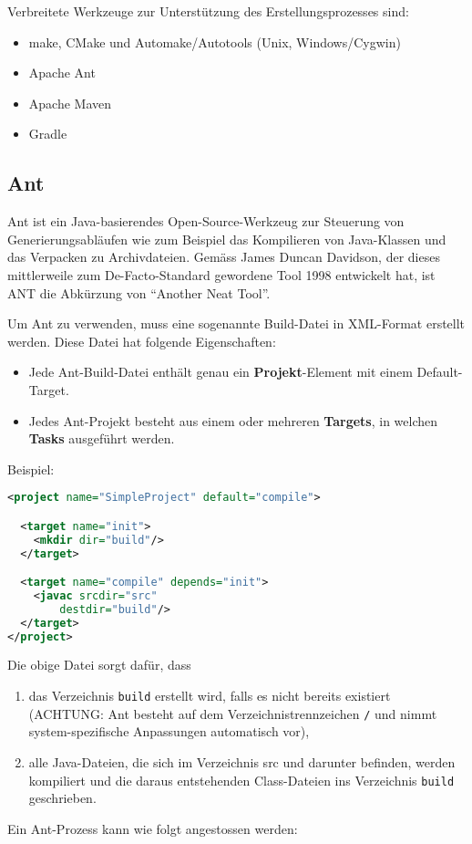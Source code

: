 Verbreitete Werkzeuge zur Unterstützung des Erstellungsprozesses sind:
\begin{itemize}
\item make, CMake und Automake/Autotools (Unix, Windows/Cygwin)
\item Apache Ant
\item Apache Maven
\item Gradle
\end{itemize}
%
\subsection{Ant}
Ant ist ein Java-basierendes Open-Source-Werkzeug zur Steuerung von
  Generierungsabläufen wie
  zum Beispiel das Kompilieren von Java-Klassen und das Verpacken
zu Archivdateien. Gemäss James Duncan
  Davidson, der dieses mittlerweile zum De-Facto-Standard gewordene Tool 1998
  entwickelt hat, ist ANT die Abkürzung von ``Another Neat Tool''.

Um Ant zu verwenden, muss eine sogenannte Build-Datei in XML-Format erstellt
werden. Diese Datei hat folgende Eigenschaften:
\begin{itemize}
\item Jede Ant-Build-Datei
   enthält genau ein {\bfseries Projekt}-Element mit einem Default-Target.
\item Jedes Ant-Projekt besteht aus einem oder mehreren {\bfseries Targets}, in
  welchen {\bfseries Tasks} ausgeführt werden.
\end{itemize}
\newslide
Beispiel:
\begin{lstlisting}[language=xml,morekeywords={project,target,javac,mkdir}]
<project name="SimpleProject" default="compile">

  <target name="init">
    <mkdir dir="build"/>
  </target>

  <target name="compile" depends="init">
    <javac srcdir="src"
        destdir="build"/>
  </target>
</project>
\end{lstlisting}
\ifslides
\else
Die obige Datei sorgt dafür, dass
\begin{enumerate}
\item das Verzeichnis \verb+build+ erstellt wird, falls es nicht
  bereits existiert (ACHTUNG: Ant besteht auf dem Verzeichnistrennzeichen
  \verb+/+ und nimmt system-spezifische Anpassungen automatisch vor),
\item alle Java-Dateien, die sich im Verzeichnis src und darunter befinden,
   werden kompiliert und die daraus entstehenden Class-Dateien ins Verzeichnis
  \verb+build+  geschrieben.
\end{enumerate}
\fi
\newslide
Ein Ant-Prozess kann wie folgt angestossen werden:

